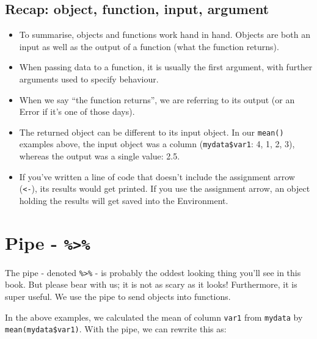 \documentclass[
  12pt,
  krantz2]{krantz}
\makeatletter
\newenvironment{Shaded}{\begin{snugshade}}{\end{snugshade}}
\newcommand{\KeywordTok}[1]{\textcolor[rgb]{0.13,0.29,0.53}{\textbf{#1}}}
\newcommand{\NormalTok}[1]{#1}
\newcommand{\OperatorTok}[1]{\textcolor[rgb]{0.81,0.36,0.00}{\textbf{#1}}}
\newcommand{\StringTok}[1]{\textcolor[rgb]{0.31,0.60,0.02}{#1}}
\newenvironment{kframe}{%
\medskip{}
\setlength{\fboxsep}{.8em}
 \def\at@end@of@kframe{}%
 \ifinner\ifhmode%
  \def\at@end@of@kframe{\end{minipage}}%
  \begin{minipage}{\columnwidth}%
 \fi\fi%
 \def\FrameCommand##1{\hskip\@totalleftmargin \hskip-\fboxsep
 \colorbox{shadecolor}{##1}\hskip-\fboxsep
     \hskip-\linewidth \hskip-\@totalleftmargin \hskip\columnwidth}%
 \MakeFramed {\advance\hsize-\width
   \@totalleftmargin\z@ \linewidth\hsize
   \@setminipage}}%
 {\par\unskip\endMakeFramed%
 \at@end@of@kframe}
\renewenvironment{Shaded}{\begin{kframe}}{\end{kframe}}
\makeatother
\begin{document}
\hypertarget{recap-object-function-input-argument}{%
\subsection{Recap: object, function, input, argument}\label{recap-object-function-input-argument}}

\begin{itemize}
\item
  To summarise, objects and functions work hand in hand.
  Objects are both an input as well as the output of a function (what the function returns).
\item
  When passing data to a function, it is usually the first argument, with further arguments used to specify behaviour.
\item
  When we say ``the function returns'', we are referring to its output (or an Error if it's one of those days).
\item
  The returned object can be different to its input object.
  In our \texttt{mean()} examples above, the input object was a column (\texttt{mydata\$var1}: 4, 1, 2, 3), whereas the output was a single value: 2.5.
\item
  If you've written a line of code that doesn't include the assignment arrow (\texttt{\textless{}-}), its results would get printed.
  If you use the assignment arrow, an object holding the results will get saved into the Environment.
\end{itemize}

\hypertarget{pipe--}{%
\section{\texorpdfstring{Pipe - \texttt{\%\textgreater{}\%}}{Pipe - \%\textgreater\%}}\label{pipe--}}


The pipe - denoted \texttt{\%\textgreater{}\%} - is probably the oddest looking thing you'll see in this book.
But please bear with us; it is not as scary as it looks!
Furthermore, it is super useful.
We use the pipe to send objects into functions.

In the above examples, we calculated the mean of column \texttt{var1} from \texttt{mydata} by \texttt{mean(mydata\$var1)}. With the pipe, we can rewrite this as:

\begin{Shaded}
\end{Shaded}
\end{document}
